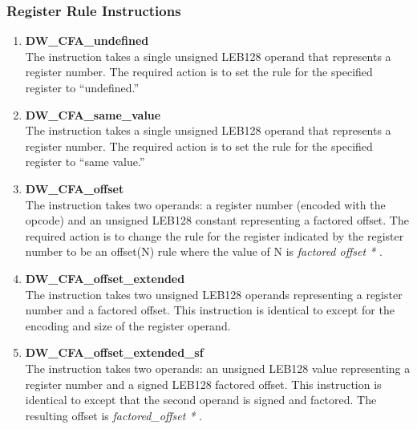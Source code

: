 \subsubsection{Register Rule Instructions}
\label{chap:registerruleinstructions}
\begin{enumerate}[1. ]

\item \textbf{DW\-\_CFA\-\_undefined} \\
The  instruction takes a single unsigned
LEB128 operand that represents a register number. The required
action is to set the rule for the specified register to
``undefined.''

\item \textbf{DW\-\_CFA\-\_same\-\_value} \\
The  instruction takes a single unsigned
LEB128 operand that represents a register number. The required
action is to set the rule for the specified register to
``same value.''

\item \textbf{DW\-\_CFA\-\_offset} \\
The  instruction takes two operands: a register
number (encoded with the opcode) and an unsigned LEB128
constant representing a factored offset. The required action
is to change the rule for the register indicated by the
register number to be an offset(N) rule where the value of
N is 
\textit{factored offset * }.

\item \textbf{DW\-\_CFA\-\_offset\-\_extended} \\
The  
instruction takes two unsigned LEB128 
operands representing a register number and a factored
offset. This instruction is identical to
except for the encoding and size of the register operand.

\item \textbf{ DW\-\_CFA\-\_offset\-\_extended\-\_sf} \\
The  
instruction takes two operands:
an unsigned LEB128 
value representing a register number and a
signed LEB128 factored offset. This instruction is identical
to  
except that the second operand is
signed and factored. The resulting offset is 
\textit{factored\_offset * }.


\end{enumerate}
